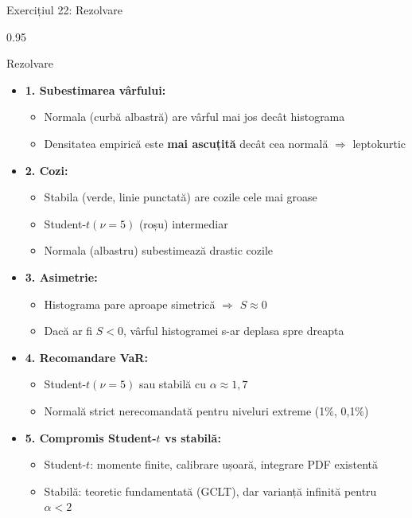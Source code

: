 \documentclass[9pt, aspectratio=169, t]{beamer}
\begin{document}
\begin{frame}[shrink=25]{Exercițiul 22: Rezolvare}
\begin{cminipage}{0.95\textwidth}
\begin{exampleblock}{Rezolvare}
\begin{itemize}\setlength{\itemsep}{0pt}
    \item \textbf{1. Subestimarea vârfului:}
    \begin{itemize}\setlength{\itemsep}{0pt}
        \item Normala (curbă albastră) are vârful mai jos decât histograma
        \item Densitatea empirică este \textbf{mai ascuțită} decât cea normală $\Rightarrow$ leptokurtic
    \end{itemize}
    \item \textbf{2. Cozi:}
    \begin{itemize}\setlength{\itemsep}{0pt}
        \item Stabila (verde, linie punctată) are cozile cele mai groase
        \item Student-$t(\nu=5)$ (roșu) intermediar
        \item Normala (albastru) subestimează drastic cozile
    \end{itemize}
    \item \textbf{3. Asimetrie:}
    \begin{itemize}\setlength{\itemsep}{0pt}
        \item Histograma pare aproape simetrică $\Rightarrow$ $S \approx 0$
        \item Dacă ar fi $S < 0$, vârful histogramei s-ar deplasa spre dreapta
    \end{itemize}
    \item \textbf{4. Recomandare VaR:}
    \begin{itemize}\setlength{\itemsep}{0pt}
        \item Student-$t(\nu=5)$ sau stabilă cu $\alpha \approx 1{,}7$
        \item Normală strict nerecomandată pentru niveluri extreme (1\%, 0{,}1\%)
    \end{itemize}
    \item \textbf{5. Compromis Student-$t$ vs stabilă:}
    \begin{itemize}\setlength{\itemsep}{0pt}
        \item Student-$t$: momente finite, calibrare ușoară, integrare PDF existentă
        \item Stabilă: teoretic fundamentată (GCLT), dar varianță infinită pentru $\alpha < 2$
    \end{itemize}
\end{itemize}
\end{exampleblock}
\end{cminipage}
\end{frame}
\end{document}
